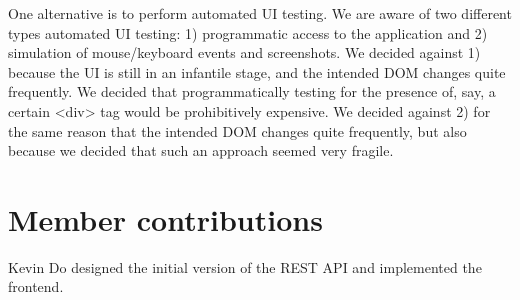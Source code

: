 \documentclass[12pt]{article}
\begin{document}
One alternative is to perform automated UI testing. We are aware of two different types automated UI testing: 1) programmatic access to the application and 2) simulation of mouse/keyboard events and screenshots. We decided against 1) because the UI is still in an infantile stage, and the intended DOM changes quite frequently. We decided that programmatically testing for the presence of, say, a certain <div> tag would be prohibitively expensive. We decided against 2) for the same reason that the intended DOM changes quite frequently, but also because we decided that such an approach seemed very fragile.

\section{Member contributions}
Kevin Do designed the initial version of the REST API and implemented the frontend.

\clearpage
\appendix
\end{document}
